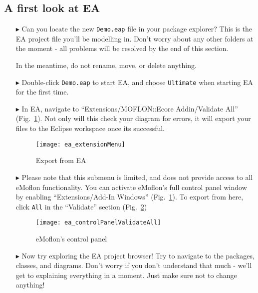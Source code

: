 \clearpage
\visHeader

\subsection{A first look at EA}

\begin{itemize}
\FloatBarrier
\hypertarget{simpleDemo vis}{}
\item[$\blacktriangleright$] Can you locate the new \texttt{Demo.eap} file in your package explorer? This is the EA project file you'll be
modelling in. Don't worry about any other folders at the moment - all problems will be resolved by the end of this section.

In the meantime, do not rename, move, or delete anything.

\item[$\blacktriangleright$] Double-click \texttt{Demo.eap} to start EA, and choose \texttt{Ultimate} when starting EA for the first time.

\item[$\blacktriangleright$] In EA, navigate to ``Extensions/MOFLON::Ecore Addin/Validate All'' (Fig.~\ref{fig:validate_dropdown}). Not only will this check
your diagram for errors, it will export your files to the Eclipse workspace once its successful.

\begin{figure}[htbp]
	\centering
  \texttt{[image: ea\_extensionMenu]}
	\caption{Export from EA} 
	\label{fig:validate_dropdown} 
\end{figure}

\item[$\blacktriangleright$] Please note that this submenu is limited, and does not provide access to all eMoflon functionality. You can activate eMoflon's full
control panel window by enabling ``Extensions/Add-In Windows'' (Fig.~\ref{fig:validate_dropdown}). To export from here, click \texttt{All} in the ``Validate''
section (Fig.~\ref{fig:controlPanel})


\begin{figure}[htbp]
	\centering
  \texttt{[image: ea\_controlPanelValidateAll]}
	\caption{eMoflon's control panel} 
	\label{fig:controlPanel} 
\end{figure}

\item[$\blacktriangleright$] Now try exploring the EA project browser! Try to navigate to the packages, classes, and diagrams. Don't worry if you don't
understand that much - we'll get to explaining everything in a moment. Just make sure not to change anything!


\end{itemize}
